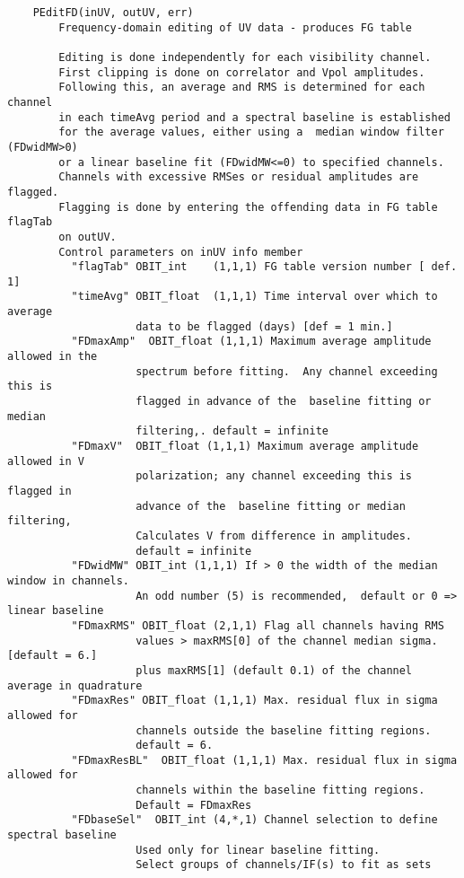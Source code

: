 \documentclass[11pt]{report}
\begin{document}
\begin{verbatim}
    PEditFD(inUV, outUV, err)
        Frequency-domain editing of UV data - produces FG table
        
        Editing is done independently for each visibility channel.  
        First clipping is done on correlator and Vpol amplitudes.  
        Following this, an average and RMS is determined for each channel 
        in each timeAvg period and a spectral baseline is established
        for the average values, either using a  median window filter (FDwidMW>0) 
        or a linear baseline fit (FDwidMW<=0) to specified channels.  
        Channels with excessive RMSes or residual amplitudes are flagged.
        Flagging is done by entering the offending data in FG table flagTab
        on outUV.
        Control parameters on inUV info member
          "flagTab" OBIT_int    (1,1,1) FG table version number [ def. 1]
          "timeAvg" OBIT_float  (1,1,1) Time interval over which to average 
                    data to be flagged (days) [def = 1 min.]
          "FDmaxAmp"  OBIT_float (1,1,1) Maximum average amplitude allowed in the
                    spectrum before fitting.  Any channel exceeding this is
                    flagged in advance of the  baseline fitting or median
                    filtering,. default = infinite 
          "FDmaxV"  OBIT_float (1,1,1) Maximum average amplitude allowed in V
                    polarization; any channel exceeding this is flagged in
                    advance of the  baseline fitting or median filtering, 
                    Calculates V from difference in amplitudes.   
                    default = infinite 
          "FDwidMW" OBIT_int (1,1,1) If > 0 the width of the median window in channels. 
                    An odd number (5) is recommended,  default or 0 => linear baseline
          "FDmaxRMS" OBIT_float (2,1,1) Flag all channels having RMS 
                    values > maxRMS[0] of the channel median sigma.[default = 6.]
                    plus maxRMS[1] (default 0.1) of the channel average in quadrature
          "FDmaxRes" OBIT_float (1,1,1) Max. residual flux in sigma allowed for 
                    channels outside the baseline fitting regions.  
                    default = 6.
          "FDmaxResBL"  OBIT_float (1,1,1) Max. residual flux in sigma allowed for 
                    channels within the baseline fitting regions. 
                    Default = FDmaxRes
          "FDbaseSel"  OBIT_int (4,*,1) Channel selection to define spectral baseline 
                    Used only for linear baseline fitting.
                    Select groups of channels/IF(s) to fit as sets 

\end{verbatim}
\end{document}
